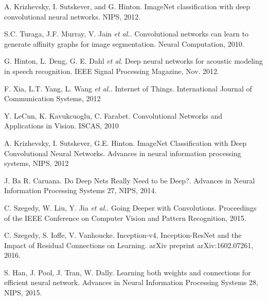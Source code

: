 \documentclass[conference]{IEEEtran}
\begin{document}
%
%
%
\begin{thebibliography}{99}

A. Krizhevsky, I. Sutskever, and G. Hinton. ImageNet classification with deep convolutional neural networks. NIPS, 2012.

S.C. Turaga, J.F. Murray, V. Jain \textit{et al.}. Convolutional networks can learn to generate affinity graphs for image segmentation. Neural Computation, 2010.

G. Hinton, L. Deng, G. E. Dahl \textit{et al}. Deep neural networks for acoustic modeling in speech recognition. IEEE Signal Processing Magazine, Nov. 2012.

F. Xia, L.T. Yang, L. Wang \textit{et al.}. Internet of Things. International Journal of Communication Systems, 2012

Y. LeCun, K. Kavukcuoglu, C. Farabet. Convolutional Networks and Applications in Vision. ISCAS, 2010

A. Krizhevsky, I. Sutskever, G.E. Hinton. ImageNet Classification with Deep Convolutional
Neural Networks. Advances in neural information processing systems, NIPS, 2012 

J. Ba R. Caruana. Do Deep Nets Really Need to be Deep?. Advances in Neural Information Processing Systems 27, NIPS, 2014.

C. Szegedy, W. Liu, Y. Jia \textit{et al.}. Going Deeper with Convolutions. Proceedings of the IEEE Conference on Computer Vision and Pattern Recognition, 2015.

C. Szegedy, S. Ioffe, V. Vanhoucke. Inception-v4, Inception-ResNet and the Impact of Residual Connections on Learning. arXiv preprint arXiv:1602.07261, 2016.

S. Han, J. Pool, J. Tran, W. Dally. Learning both weights and connections for efficient neural network. Advances in Neural Information Processing Systems 28, NIPS, 2015.


\end{thebibliography}
\end{document}
